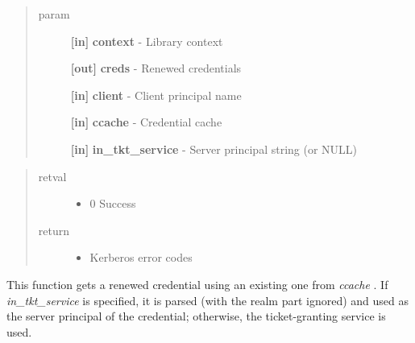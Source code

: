 \documentclass[letterpaper,10pt,english]{sphinxmanual}
\begin{document}
\begin{fulllineitems}
\label{appdev/refs/api/krb5_get_renewed_creds:c.krb5_get_renewed_creds}
\end{fulllineitems}

\begin{quote}\begin{description}
\item[{param}] \leavevmode
\textbf{{[}in{]}} \textbf{context} - Library context

\textbf{{[}out{]}} \textbf{creds} - Renewed credentials

\textbf{{[}in{]}} \textbf{client} - Client principal name

\textbf{{[}in{]}} \textbf{ccache} - Credential cache

\textbf{{[}in{]}} \textbf{in\_tkt\_service} - Server principal string (or NULL)

\end{description}\end{quote}
\begin{quote}\begin{description}
\item[{retval}] \leavevmode\begin{itemize}
\item {} 
0   Success

\end{itemize}

\item[{return}] \leavevmode\begin{itemize}
\item {} 
Kerberos error codes

\end{itemize}

\end{description}\end{quote}

This function gets a renewed credential using an existing one from \emph{ccache} . If \emph{in\_tkt\_service} is specified, it is parsed (with the realm part ignored) and used as the server principal of the credential; otherwise, the ticket-granting service is used.
\end{document}
